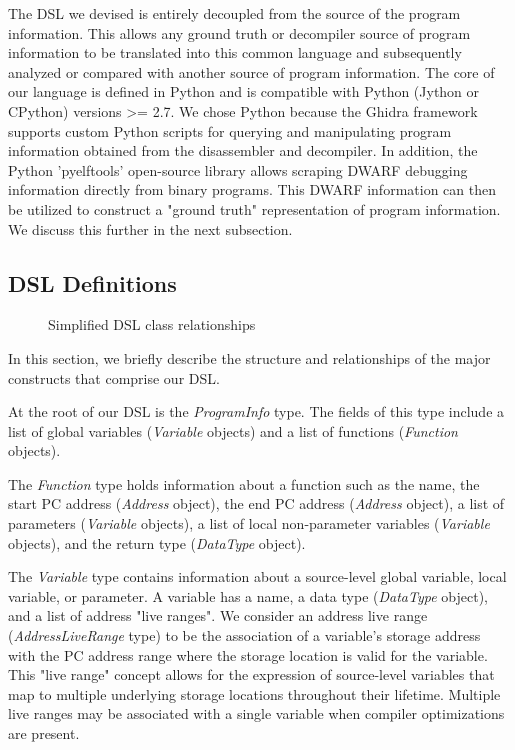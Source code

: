 The DSL we devised is entirely decoupled from the source of the program information. This allows any ground truth or decompiler source of program information to be translated into this common language and subsequently analyzed or compared with another source of program information. The core of our language is defined in Python and is compatible with Python (Jython or CPython) versions >= 2.7. We chose Python because the Ghidra framework supports custom Python scripts for querying and manipulating program information obtained from the disassembler and decompiler. In addition, the Python 'pyelftools' open-source library \cite{bib:pyelftools} allows scraping DWARF debugging information directly from binary programs. This DWARF information can then be utilized to construct a "ground truth" representation of program information. We discuss this further in the next subsection.

\subsection{DSL Definitions}

\begin{figure}
    \centering
    \scalebox{0.4}{
        
    }
    \caption{Simplified DSL class relationships}
    \label{fig:dsl}
\end{figure}

In this section, we briefly describe the structure and relationships of the major constructs that comprise our DSL.

At the root of our DSL is the \emph{ProgramInfo} type. The fields of this type include a list of global variables (\emph{Variable} objects) and a list of functions (\emph{Function} objects).

The \emph{Function} type holds information about a function such as the name, the start PC address (\emph{Address} object), the end PC address (\emph{Address} object), a list of parameters (\emph{Variable} objects), a list of local non-parameter variables (\emph{Variable} objects), and the return type (\emph{DataType} object).

The \emph{Variable} type contains information about a source-level global variable, local variable, or parameter. A variable has a name, a data type (\emph{DataType} object), and a list of address "live ranges". We consider an address live range (\emph{AddressLiveRange} type) to be the association of a variable's storage address with the PC address range where the storage location is valid for the variable. This "live range" concept allows for the expression of source-level variables that map to multiple underlying storage locations throughout their lifetime. Multiple live ranges may be associated with a single variable when compiler optimizations are present.


